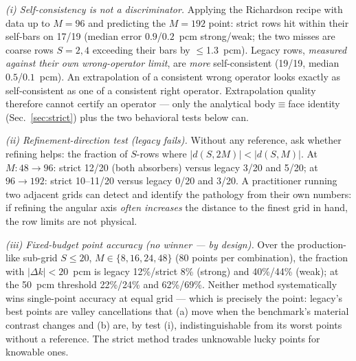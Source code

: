 \documentclass[11pt,a4paper]{article}
\begin{document}
\emph{(i) Self-consistency is not a discriminator.} Applying the
Richardson recipe with data up to $M{=}96$ and predicting the
$M{=}192$ point: strict rows hit within their self-bars on 17/19
(median error $0.9$/$0.2$~pcm strong/weak; the two misses are
coarse rows $S{=}2,4$ exceeding their bars by $\le$1.3~pcm).  Legacy
rows, \emph{measured against their own wrong-operator limit}, are
\emph{more} self-consistent (19/19, median $0.5$/$0.1$~pcm). An extrapolation of
a consistent wrong operator looks exactly as self-consistent as one
of a consistent right operator. Extrapolation quality therefore
cannot certify an operator --- only the analytical
body$\equiv$face identity (Sec.~\ref{sec:strict}) plus the two
behavioral tests below can.

\emph{(ii) Refinement-direction test (legacy fails).} Without any
reference, ask whether refining helps: the fraction of $S$-rows where
$|d(S,2M)| < |d(S,M)|$. At $M{:}48{\to}96$: strict 12/20 (both
absorbers) versus legacy 3/20 and 5/20; at $96{\to}192$: strict
10--11/20 versus legacy 0/20 and 3/20. A practitioner running two
adjacent grids can detect and identify the pathology from their own
numbers: if refining the angular axis \emph{often increases} the
distance to the finest grid in hand, the row limits are not physical.

\emph{(iii) Fixed-budget point accuracy (no winner --- by design).}
Over the production-like sub-grid $S\le20$, $M\in\{8,16,24,48\}$
(80 points per combination), the fraction with $|\Delta k|<20$~pcm is
legacy 12\%/strict 8\% (strong) and 40\%/44\% (weak); at the 50~pcm
threshold 22\%/24\% and 62\%/69\%. Neither method systematically wins
single-point accuracy at equal grid --- which is precisely the point:
legacy's best points are valley cancellations that (a) move when the
benchmark's material contrast changes and (b) are, by test (i),
indistinguishable from its worst points without a reference. The
strict method trades unknowable lucky points for knowable ones.
\end{document}
